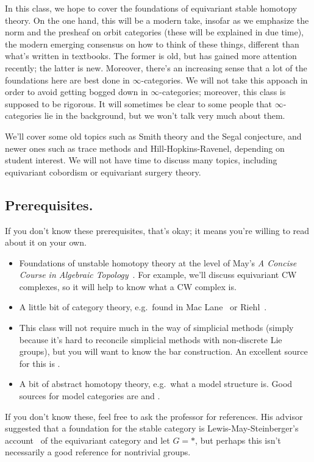 In this class, we hope to cover the foundations of equivariant stable homotopy theory. On the one hand, this will
be a modern take, insofar as we emphasize the norm and the presheaf on orbit categories (these will be explained in
due time), the modern emerging consensus on how to think of these things, different than what's written in
textbooks. The former is old, but has gained more attention recently; the latter is new. Moreover, there's an
increasing sense that a lot of the foundations here are best done in $\infty$-categories. We will not take this
appoach in order to avoid getting bogged down in $\infty$-categories; moreover, this class is supposed to be
rigorous. It will sometimes be clear to some people that $\infty$-categories lie in the background, but we won't
talk very much about them.

We'll cover some old topics such as Smith theory and the Segal conjecture, and newer ones such as trace methods
and Hill-Hopkins-Ravenel, depending on student interest. We will not have time to discuss many topics, including
equivariant cobordism or equivariant surgery theory.
\subsection*{Prerequisites.} If you don't know these prerequisites, that's okay; it means you're willing to read
about it on your own.
\begin{itemize}
	\item Foundations of unstable homotopy theory at the level of May's \textit{A Concise Course in Algebraic
	Topology}~\cite{ConciseCourse}. For example, we'll discuss equivariant CW complexes, so it will help to know
	what a CW complex is.
	\item A little bit of category theory, e.g.\ found in Mac Lane~\cite{MacLane} or Riehl~\cite{RiehlCTC}.
	\item This class will not require much in the way of simplicial methods (simply because it's hard to reconcile
	simplicial methods with non-discrete Lie groups), but you will want to know the bar construction. An excellent source for this is \cite[Chapter 4]{RiehlCHT}.
	\item A bit of abstract homotopy theory, e.g.\ what a model structure is. Good sources for model categories are \cite[Part III]{RiehlCHT} and \cite{Hovey}.
\end{itemize}
If you don't know these, feel free to ask the professor for references. His advisor suggested that a foundation for
the stable category is Lewis-May-Steinberger's account~\cite{LMS} of the equivariant category and let $G = *$, but
perhaps this isn't necessarily a good reference for nontrivial groups.

